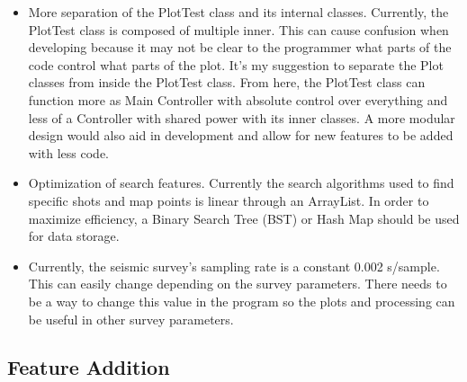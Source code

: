 \documentclass[12pt]{article}
\begin{document}
\begin{itemize}
\item More separation of the PlotTest class and its internal classes. Currently, the PlotTest class is composed of multiple inner. This can cause confusion when developing because it may not be clear to the programmer what parts of the code control what parts of the plot. It's my suggestion to separate the Plot classes from inside the PlotTest class. From here, the PlotTest class can function more as Main Controller with absolute control over everything and less of a Controller with shared power with its inner classes. A more modular design would also aid in development and allow for new features to be added with less code.

\item Optimization of search features. Currently the search algorithms used to find specific shots and map points is linear through an ArrayList. In order to maximize efficiency, a Binary Search Tree (BST) or Hash Map should be used for data storage.

\item Currently, the seismic survey's sampling rate is a constant 0.002 s/sample. This can easily change depending on the survey parameters. There needs to be a way to change this value in the program so the plots and processing can be useful in other survey parameters.
\end{itemize}

\subsection{Feature Addition}
\end{document}
